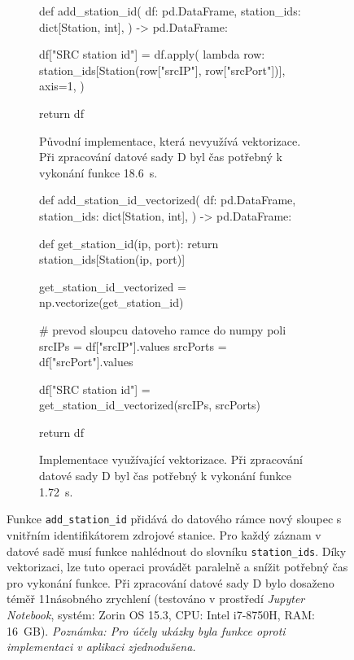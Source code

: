 \begin{figure}[H]%
    \centering
    \begin{subfigure}{0.8\textwidth}
        \centering
        
        \begin{python}
def add_station_id(
    df: pd.DataFrame,
    station_ids: dict[Station, int],
) -> pd.DataFrame:

    df["SRC station id"] = df.apply(
        lambda row: station_ids[Station(row["srcIP"], row["srcPort"])],
        axis=1,
    )

    return df
        \end{python}
        \caption{Původní  implementace, která nevyužívá vektorizace. Při zpracování datové sady D byl čas potřebný k vykonání funkce 18.6~s.}
        \label{fig:vectorization1}
    \end{subfigure}
    \par\medskip
    \begin{subfigure}{0.8\textwidth}
        \centering
        
        \begin{python}
def add_station_id_vectorized(
    df: pd.DataFrame,
    station_ids: dict[Station, int],
) -> pd.DataFrame:

    def get_station_id(ip, port):
        return station_ids[Station(ip, port)]

    get_station_id_vectorized = np.vectorize(get_station_id)

    # prevod sloupcu datoveho ramce do numpy poli
    srcIPs = df["srcIP"].values
    srcPorts = df["srcPort"].values

    df["SRC station id"] = get_station_id_vectorized(srcIPs, srcPorts)

    return df
        \end{python}
        
        
        \caption{Implementace využívající vektorizace. Při zpracování datové sady D byl čas potřebný k vykonání funkce 1.72~s.}
        \label{fig:vectorization2}
    \end{subfigure}
    \caption{Funkce \texttt{add\_station\_id} přidává do datového rámce nový sloupec s vnitřním identifikátorem zdrojové stanice. Pro každý záznam v datové sadě musí funkce nahlédnout do slovníku \texttt{station\_ids}. Díky vektorizaci, lze tuto operaci provádět paralelně a snížit potřebný čas pro vykonání funkce. Při zpracování datové sady D bylo dosaženo téměř 11násobného zrychlení (testováno v prostředí \emph{Jupyter Notebook}, systém: Zorin OS 15.3, CPU: Intel i7-8750H, RAM: 16~GB). \emph{Poznámka: Pro účely ukázky byla funkce oproti implementaci v aplikaci zjednodušena.}}%
    \label{fig:vectorization}%
\end{figure}




